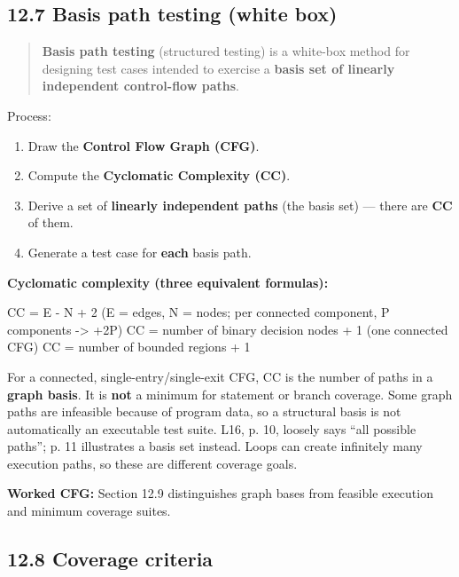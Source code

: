 \begin{studycolumns}
\vspace{0pt}

\subsection*{12.7 Basis path testing (white box)}

\begin{quote}\small\color{navy}
\textbf{Basis path testing} (structured testing) is a white-box method for designing test cases intended to exercise a \textbf{basis set of linearly independent control-flow paths}.

\end{quote}
Process:

\begin{enumerate}
\item Draw the \textbf{Control Flow Graph (CFG)}.
\item Compute the \textbf{Cyclomatic Complexity (CC)}.
\item Derive a set of \textbf{linearly independent paths} (the basis set) --- there are \textbf{CC} of them.
\item Generate a test case for \textbf{each} basis path.
\end{enumerate}
\textbf{Cyclomatic complexity (three equivalent formulas):}


\begin{ReferenceCode}
CC = E - N + 2        (E = edges, N = nodes; per connected component, P components -> +2P)
CC = number of binary decision nodes + 1   (one connected CFG)
CC = number of bounded regions + 1
\end{ReferenceCode}
For a connected, single-entry/\allowbreak{}single-exit CFG, CC is the number of paths in a \textbf{graph basis}. It is \textbf{not} a minimum for statement or branch coverage. Some graph paths are infeasible because of program data, so a structural basis is not automatically an executable test suite. L16, p. 10, loosely says ``all possible paths''; p. 11 illustrates a basis set instead. Loops can create infinitely many execution paths, so these are different coverage goals.

\textbf{Worked CFG:} Section 12.9 distinguishes graph bases from feasible execution and minimum coverage suites.
\end{studycolumns}

\subsection*{12.8 Coverage criteria}



